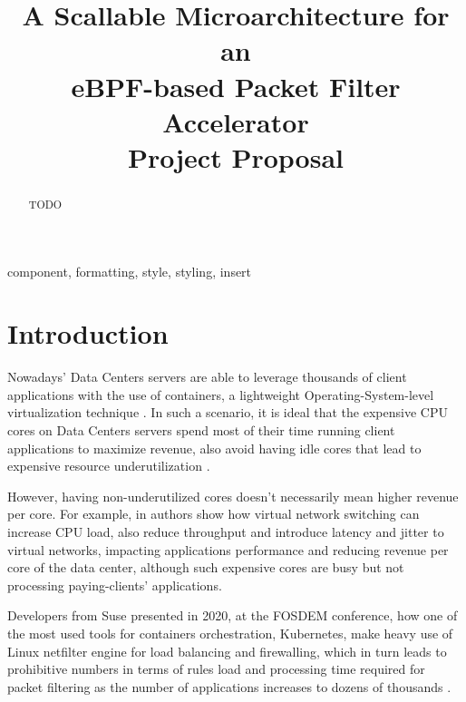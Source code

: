 \documentclass[conference]{IEEEtran}
\begin{document}
\title{A Scallable Microarchitecture for an \\ eBPF-based Packet Filter Accelerator\\
{\large Project Proposal}
}

\author{
}

\maketitle

\begin{abstract}
TODO
\end{abstract}

\begin{IEEEkeywords}
component, formatting, style, styling, insert
\end{IEEEkeywords}

\section{Introduction}
Nowadays' Data Centers servers are able to leverage thousands of client applications with the use of containers, a lightweight Operating-System-level virtualization technique \cite{fouladi:2019:laptop2lambda}. In such a scenario, it is ideal that the expensive CPU cores on Data Centers servers spend most of their time running client applications to maximize revenue, also avoid having idle cores that lead to expensive resource underutilization \cite{li:2020:dccpi}. 

However, having non-underutilized cores doesn't necessarily mean higher revenue per core. For example, in \cite{emmerich:2018:ovs-throughput} authors show how virtual network switching can increase CPU load, also reduce throughput and introduce latency and jitter to virtual networks, impacting applications performance and reducing revenue per core of the data center, although such expensive cores are busy but not processing paying-clients' applications.

Developers from Suse presented in 2020, at the FOSDEM conference, how one of the most used tools for containers orchestration, Kubernetes, make heavy use of Linux netfilter engine for load balancing and firewalling, which in turn leads to prohibitive numbers in terms of rules load and processing time required for packet filtering as the number of applications increases to dozens of thousands \cite{restecki:2020:iptables-ebpf}.
\end{document}

